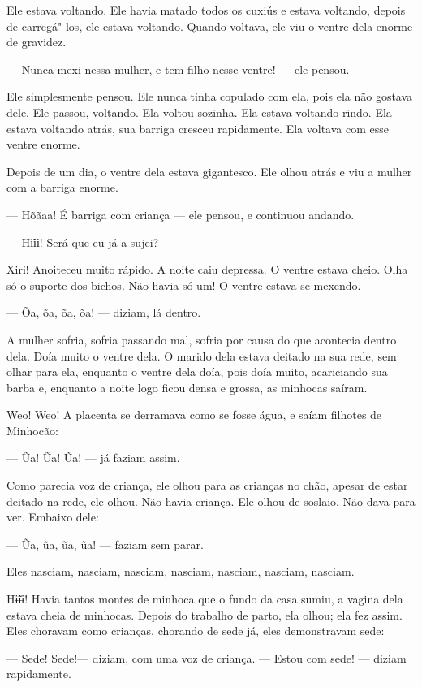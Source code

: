 Ele estava voltando. Ele havia matado todos os cuxiús e estava voltando,
depois de carregá"-los, ele estava voltando. Quando voltava, ele viu o
ventre dela enorme de gravidez. 

--- Nunca mexi nessa mulher, e tem filho nesse ventre! --- ele pensou. 

Ele simplesmente pensou. Ele nunca tinha copulado com ela, pois ela não
gostava dele. Ele passou, voltando. Ela voltou sozinha. Ela estava
voltando rindo. Ela estava voltando atrás, sua barriga cresceu
rapidamente. Ela voltava com esse ventre enorme. 

Depois de um dia, o ventre dela estava gigantesco. Ele olhou atrás e viu
a mulher com a barriga enorme. 

--- Hõãaa! É barriga com criança --- ele pensou, e continuou andando. 

--- Hɨ̃ɨɨ! Será que eu já a sujei?

Xiri! Anoiteceu muito rápido. A noite caiu depressa. O ventre estava
cheio. Olha só o suporte dos bichos. Não havia só um! O ventre estava se
mexendo. 

--- Õa, õa, õa, õa! --- diziam, lá dentro. 

A mulher sofria, sofria passando mal, sofria por causa do que acontecia
dentro dela. Doía muito o ventre dela. O marido dela estava deitado na
sua rede, sem olhar para ela, enquanto o ventre dela doía, pois doía
muito, acariciando sua barba e, enquanto a noite logo ficou densa e
grossa, as minhocas saíram.

Weo! Weo! A placenta se derramava como se fosse água, e saíam filhotes de
Minhocão:

--- Ũa! Ũa! Ũa! --- já faziam assim. 

Como parecia voz de criança, ele olhou para as crianças no chão, apesar
de estar deitado na rede, ele olhou. Não havia criança. Ele olhou de
soslaio. Não dava para ver. Embaixo dele:

--- Ũa, ũa, ũa, ũa! --- faziam sem parar. 

Eles nasciam, nasciam, nasciam, nasciam, nasciam, nasciam, nasciam. 

Hɨ̃ɨɨ! Havia tantos montes de minhoca que o fundo da casa sumiu, a vagina
dela estava cheia de minhocas. Depois do trabalho de parto, ela
olhou; ela fez assim. Eles choravam como crianças, chorando de sede
já, eles demonstravam sede: 

--- Sede! Sede!--- diziam, com uma voz de criança. --- Estou com sede! ---
diziam rapidamente. 

